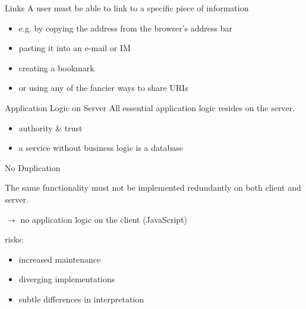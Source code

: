 \documentclass{beamer}
\begin{document}
\begin{frame}{Links}
  A user must be able to link to a specific piece of information

  \begin{itemize}
    \item e.g. by copying the address from the browser's address bar
    \item pasting it into an e-mail or IM
    \item creating a bookmark
    \item or using any of the fancier ways to share URIs
  \end{itemize}
\end{frame}

\begin{frame}{Application Logic on Server}
  All essential application logic resides on the server.

  \begin{itemize}
    \item authority \& trust
    \item a service without business logic is a database
  \end{itemize}

\end{frame}

\begin{frame}{No Duplication}

  The same functionality must not be implemented redundantly on both client and server.


  \vspace*{0.25cm}
  \ensuremath{\rightarrow} no application logic on the client (JavaScript)

  \vspace*{0.5cm}
  risks:
  \begin{itemize}
    \item increased maintenance
    \item diverging implementations
    \item subtle differences in interpretation
  \end{itemize}
\end{frame}
\end{document}
